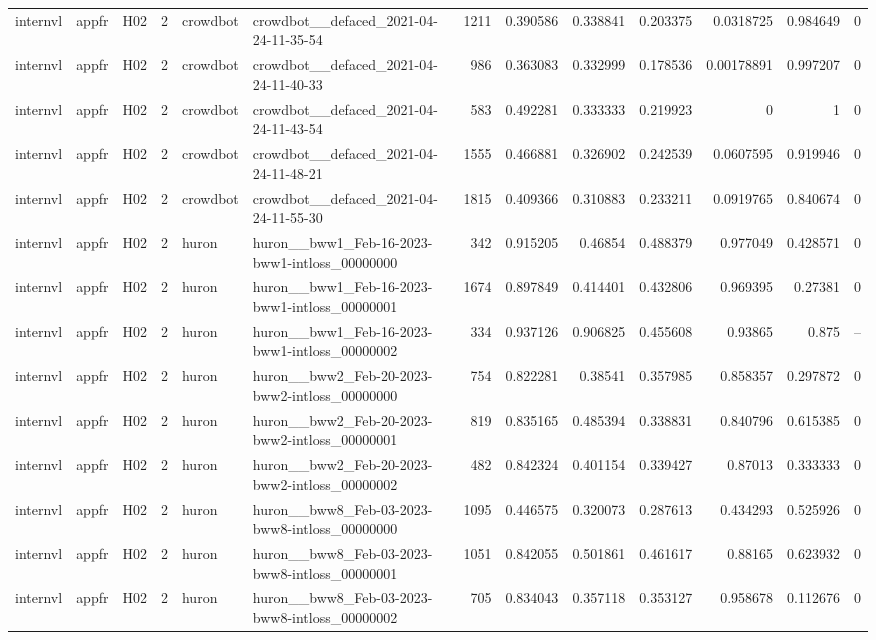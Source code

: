 \begin{longtable}{lllrllrrrrrrr}
internvl & appfr & H02 & 2 & crowdbot & crowdbot\_\_defaced\_2021-04-24-11-35-54 & 1211 & 0.390586 & 0.338841 & 0.203375 & 0.0318725 & 0.984649 & 0 \\
internvl & appfr & H02 & 2 & crowdbot & crowdbot\_\_defaced\_2021-04-24-11-40-33 & 986 & 0.363083 & 0.332999 & 0.178536 & 0.00178891 & 0.997207 & 0 \\
internvl & appfr & H02 & 2 & crowdbot & crowdbot\_\_defaced\_2021-04-24-11-43-54 & 583 & 0.492281 & 0.333333 & 0.219923 & 0 & 1 & 0 \\
internvl & appfr & H02 & 2 & crowdbot & crowdbot\_\_defaced\_2021-04-24-11-48-21 & 1555 & 0.466881 & 0.326902 & 0.242539 & 0.0607595 & 0.919946 & 0 \\
internvl & appfr & H02 & 2 & crowdbot & crowdbot\_\_defaced\_2021-04-24-11-55-30 & 1815 & 0.409366 & 0.310883 & 0.233211 & 0.0919765 & 0.840674 & 0 \\
internvl & appfr & H02 & 2 & huron & huron\_\_bww1\_Feb-16-2023-bww1-intloss\_00000000 & 342 & 0.915205 & 0.46854 & 0.488379 & 0.977049 & 0.428571 & 0 \\
internvl & appfr & H02 & 2 & huron & huron\_\_bww1\_Feb-16-2023-bww1-intloss\_00000001 & 1674 & 0.897849 & 0.414401 & 0.432806 & 0.969395 & 0.27381 & 0 \\
internvl & appfr & H02 & 2 & huron & huron\_\_bww1\_Feb-16-2023-bww1-intloss\_00000002 & 334 & 0.937126 & 0.906825 & 0.455608 & 0.93865 & 0.875 & -- \\
internvl & appfr & H02 & 2 & huron & huron\_\_bww2\_Feb-20-2023-bww2-intloss\_00000000 & 754 & 0.822281 & 0.38541 & 0.357985 & 0.858357 & 0.297872 & 0 \\
internvl & appfr & H02 & 2 & huron & huron\_\_bww2\_Feb-20-2023-bww2-intloss\_00000001 & 819 & 0.835165 & 0.485394 & 0.338831 & 0.840796 & 0.615385 & 0 \\
internvl & appfr & H02 & 2 & huron & huron\_\_bww2\_Feb-20-2023-bww2-intloss\_00000002 & 482 & 0.842324 & 0.401154 & 0.339427 & 0.87013 & 0.333333 & 0 \\
internvl & appfr & H02 & 2 & huron & huron\_\_bww8\_Feb-03-2023-bww8-intloss\_00000000 & 1095 & 0.446575 & 0.320073 & 0.287613 & 0.434293 & 0.525926 & 0 \\
internvl & appfr & H02 & 2 & huron & huron\_\_bww8\_Feb-03-2023-bww8-intloss\_00000001 & 1051 & 0.842055 & 0.501861 & 0.461617 & 0.88165 & 0.623932 & 0 \\
internvl & appfr & H02 & 2 & huron & huron\_\_bww8\_Feb-03-2023-bww8-intloss\_00000002 & 705 & 0.834043 & 0.357118 & 0.353127 & 0.958678 & 0.112676 & 0 \\

\end{longtable}
